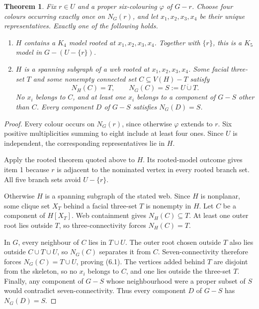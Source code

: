 \documentclass[11pt]{amsart}
\newtheorem{theorem}{Theorem}[section]
\begin{document}
\begin{theorem}\label{thm:four-centre-web}
Fix $r\in U$ and a proper six-colouring $\varphi$ of $G-r$.  Choose four
colours occurring exactly once on $N_G(r)$, and let
$x_1,x_2,x_3,x_4$ be their unique representatives.  Exactly one of the
following holds.

\begin{enumerate}
\item $H$ contains a $K_4$ model rooted at $x_1,x_2,x_3,x_4$.
      Together with $\{r\}$, this is a $K_5$ model in
      $G-(U-\{r\})$.
\item $H$ is a spanning subgraph of a web rooted at
      $x_1,x_2,x_3,x_4$.  Some facial three-set $T$ and some nonempty
      connected set $C\subseteq V(H)-T$ satisfy
      \[
             N_H(C)=T,\qquad
             N_G(C)=S:=U\mathbin{\dot\cup}T.           \tag{6.1}
      \]
      No $x_i$ belongs to $C$, and at least one $x_i$ belongs to a component
      of $G-S$ other than $C$.  Every component $D$ of $G-S$ satisfies
      $N_G(D)=S$.
\end{enumerate}
\end{theorem}

\begin{proof}
Every colour occurs on $N_G(r)$, since otherwise $\varphi$ extends to
$r$.  Six positive multiplicities summing to eight include at least four
ones.  Since $U$ is independent, the corresponding representatives lie in
$H$.

Apply the rooted theorem quoted above to $H$.  Its rooted-model outcome
gives item 1 because $r$ is adjacent to the nominated vertex in every rooted
branch set.  All five branch sets avoid $U-\{r\}$.

Otherwise $H$ is a spanning subgraph of the stated web.  Since $H$ is
nonplanar, some clique set $X_T$ behind a facial three-set $T$ is nonempty
in $H$.  Let $C$ be a component of $H[X_T]$.  Web containment gives
$N_H(C)\subseteq T$.
At least one outer root lies outside $T$, so three-connectivity forces
$N_H(C)=T$.

In $G$, every neighbour of $C$ lies in $T\cup U$.  The outer root chosen
outside $T$ also lies outside $C\cup T\cup U$, so $N_G(C)$ separates it
from $C$.  Seven-connectivity therefore forces $N_G(C)=T\cup U$, proving
(6.1).  The vertices added behind $T$ are disjoint from the skeleton, so no
$x_i$ belongs to $C$, and one lies outside the three-set $T$.  Finally, any
component of $G-S$ whose
neighbourhood were a proper subset of $S$ would contradict
seven-connectivity.  Thus every component $D$ of $G-S$ has $N_G(D)=S$.
\end{proof}
\end{document}
